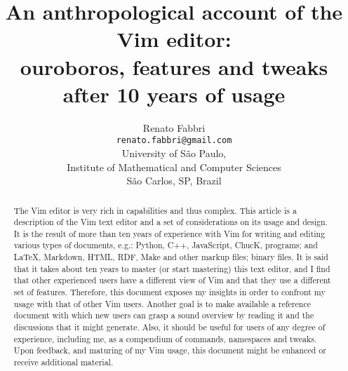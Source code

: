 \documentclass{article}
\begin{document}
\title{An anthropological account of the Vim editor:\\
ouroboros, features and tweaks after 10 years of usage}
\author{Renato Fabbri\\
\texttt{renato.fabbri@gmail.com}\\
University of São Paulo,\\
Institute of Mathematical and Computer Sciences\\
São Carlos, SP, Brazil
}
\maketitle
\begin{abstract}
The Vim editor is very rich in capabilities
and thus complex.
This article is a description of the Vim text editor
and a set of considerations on its usage and design.
It is the result of more than ten years of experience
with Vim for writing and editing various types of documents,
e.g.:
Python, C++, JavaScript, ChucK, programs;
and \LaTeX, Markdown, HTML, RDF, Make and other markup files;
binary files.
It is said that it takes about ten years to master (or start mastering)
this text editor, and I find that other experienced users
have a different view of Vim and that they use a different
set of features.
Therefore, this document exposes my insights in order
to confront my usage with that of other Vim users.
Another goal is
to make available a reference document with which new users
can grasp a sound overview by reading it and the discussions that
it might generate.
Also, it should be useful for users of any degree of experience,
including me, as a compendium of commands, namespaces and tweaks.
Upon feedback, and maturing of my Vim usage,
this document might be enhanced or receive additional
material.
\end{abstract}
\end{document}
